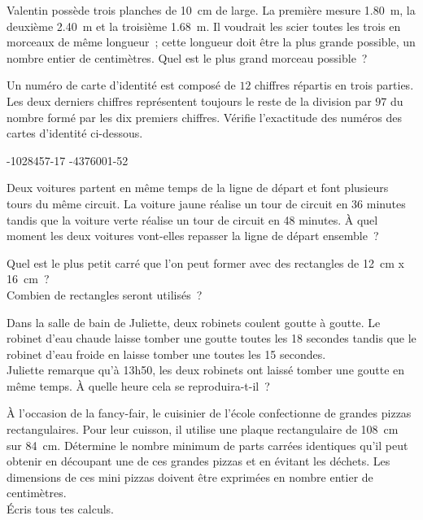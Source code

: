 \documentclass[../math2.tex]{subfiles}
\begin{document}
\begin{exercise}
    Valentin possède trois planches de \SI{10}{cm} de large. La première mesure \SI{1,80}{m}, la deuxième \SI{2,40}{m} et la troisième \SI{1,68}{m}. Il voudrait les scier toutes les trois en morceaux de même longueur~; cette longueur doit être la plus grande possible, un nombre entier de centimètres. Quel est le plus grand morceau possible~?
\end{exercise}

\begin{exercise}
    Un numéro de carte d'identité est composé de $12$ chiffres répartis en trois parties. Les deux derniers chiffres représentent toujours le reste de la division par $97$ du nombre formé par les dix premiers chiffres. Vérifie l'exactitude des numéros des cartes d'identité ci-dessous.
    \begin{tasks}
        -1028457-17
        -4376001-52
    \end{tasks}
\end{exercise}

\begin{exercise}
    Deux voitures partent en même temps de la ligne de départ et font plusieurs tours du même circuit. La voiture jaune réalise un tour de circuit en 36 minutes tandis que la voiture verte réalise un tour de circuit en 48 minutes. À quel moment les deux voitures vont-elles repasser la ligne de départ ensemble~?
\end{exercise}

\begin{exercise}
    Quel est le plus petit carré que l'on peut former avec des rectangles de \SI{12}{cm} x \SI{16}{cm}~? \\ Combien de rectangles seront utilisés~?
\end{exercise}

\begin{exercise}
    Dans la salle de bain de Juliette, deux robinets coulent goutte à goutte. Le robinet d'eau chaude laisse tomber une goutte toutes les 18 secondes tandis que le robinet d'eau froide en laisse tomber une toutes les 15 secondes.\\
    Juliette remarque qu'à 13h50, les deux robinets ont laissé tomber une goutte en même temps. À quelle heure cela se reproduira-t-il~?
\end{exercise}

\begin{exercise}
    À l'occasion de la fancy-fair, le cuisinier de l'école confectionne de grandes pizzas rectangulaires. Pour leur cuisson, il utilise une plaque rectangulaire de \SI{108}{cm} sur \SI{84}{cm}. Détermine le nombre minimum de parts carrées identiques qu'il peut obtenir en découpant une de ces grandes pizzas et en évitant les déchets. Les dimensions de ces mini pizzas doivent être exprimées en nombre entier de centimètres. \\
    Écris tous tes calculs.
\end{exercise}
\end{document}
